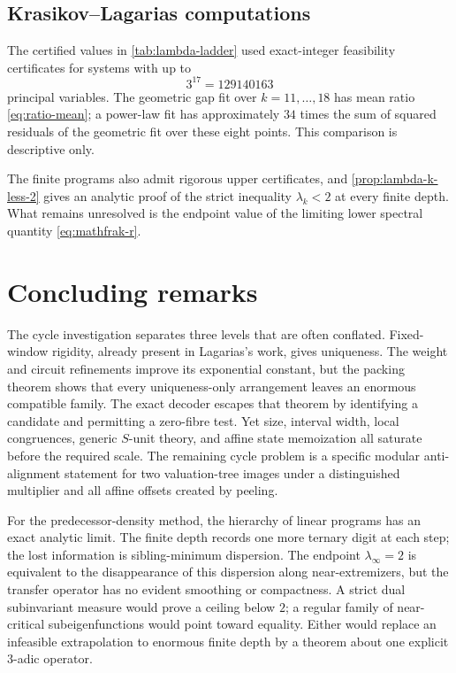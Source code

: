 \documentclass[11pt]{amsart}
\numberwithin{equation}{section}
\begin{document}
\subsection{Krasikov--Lagarias computations}

The certified values in \cref{tab:lambda-ladder} used exact-integer feasibility certificates for systems with up to
\[
3^{17}=129140163
\]
principal variables.  The geometric gap fit over $k=11,\ldots,18$ has mean ratio \eqref{eq:ratio-mean}; a power-law fit has approximately $34$ times the sum of squared residuals of the geometric fit over these eight points.  This comparison is descriptive only.

The finite programs also admit rigorous upper certificates, and \cref{prop:lambda-k-less-2} gives an analytic proof of the strict inequality $\lambda_k<2$ at every finite depth.  What remains unresolved is the endpoint value of the limiting lower spectral quantity \eqref{eq:mathfrak-r}.

\section{Concluding remarks}

The cycle investigation separates three levels that are often conflated.  Fixed-window rigidity, already present in Lagarias's work, gives uniqueness.  The weight and circuit refinements improve its exponential constant, but the packing theorem shows that every uniqueness-only arrangement leaves an enormous compatible family.  The exact decoder escapes that theorem by identifying a candidate and permitting a zero-fibre test.  Yet size, interval width, local congruences, generic $S$-unit theory, and affine state memoization all saturate before the required scale.  The remaining cycle problem is a specific modular anti-alignment statement for two valuation-tree images under a distinguished multiplier and all affine offsets created by peeling.

For the predecessor-density method, the hierarchy of linear programs has an exact analytic limit.  The finite depth records one more ternary digit at each step; the lost information is sibling-minimum dispersion.  The endpoint $\lambda_\infty=2$ is equivalent to the disappearance of this dispersion along near-extremizers, but the transfer operator has no evident smoothing or compactness.  A strict dual subinvariant measure would prove a ceiling below $2$; a regular family of near-critical subeigenfunctions would point toward equality.  Either would replace an infeasible extrapolation to enormous finite depth by a theorem about one explicit $3$-adic operator.
\end{document}
